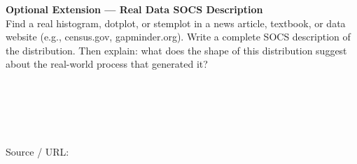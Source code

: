 \documentclass[10pt]{article}
\begin{document}
\vspace{0.14in}

\begin{extensionbox}
\small
\textbf{Optional Extension --- Real Data SOCS Description}\\[4pt]
Find a real histogram, dotplot, or stemplot in a news article, textbook, or
data website (e.g., census.gov, gapminder.org). Write a complete SOCS
description of the distribution. Then explain: what does the shape of this
distribution suggest about the real-world process that generated it?

\vspace{8pt}
\writeline\\[1pt]\writeline\\[1pt]\writeline\\[1pt]\writeline\\[1pt]\writeline

\vspace{4pt}
\textcolor{slate}{\scriptsize Source / URL:\;\blank{11cm}}
\end{extensionbox}
\end{document}
